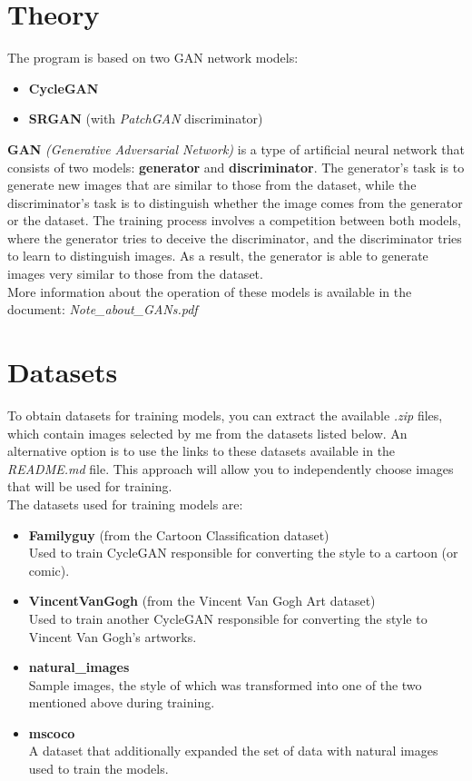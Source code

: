 \documentclass{article}
\begin{document}
\section{Theory}
The program is based on two GAN network models:
\begin{itemize}
    \setlength\itemsep{0pt}
    \item \textbf{CycleGAN}
    \item \textbf{SRGAN} (with \textit{PatchGAN} discriminator)
\end{itemize}
\textbf{GAN} \textit{(Generative Adversarial Network)} is a type of artificial neural network that consists of two models: \textbf{generator} and \textbf{discriminator}.
The generator's task is to generate new images that are similar to those from the dataset, while the discriminator's task is to distinguish whether the image comes from the generator or the dataset.
The training process involves a competition between both models, where the generator tries to deceive the discriminator, and the discriminator tries to learn to distinguish images.
As a result, the generator is able to generate images very similar to those from the dataset.
\vspace{3mm} \\
More information about the operation of these models is available in the document: \textit{Note\_about\_GANs.pdf}

\section{Datasets}
To obtain datasets for training models, you can extract the available \textit{.zip} files, which contain images selected by me from the datasets listed below. An alternative option is to use the links to these datasets available in the \textit{README.md} file. This approach will allow you to independently choose images that will be used for training.
\vspace{3mm} \\
The datasets used for training models are:
\begin{itemize}
    \item \textbf{Familyguy} (from the Cartoon Classification dataset) \\
Used to train CycleGAN responsible for converting the style to a cartoon (or comic).
    \item \textbf{VincentVanGogh} (from the Vincent Van Gogh Art dataset) \\
Used to train another CycleGAN responsible for converting the style to Vincent Van Gogh's artworks.
    \item \textbf{natural\_images} \\
Sample images, the style of which was transformed into one of the two mentioned above during training.
    \item \textbf{mscoco} \\
A dataset that additionally expanded the set of data with natural images used to train the models.
\end{itemize}
\end{document}

